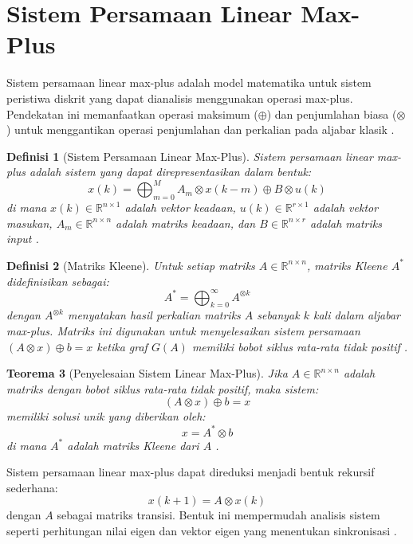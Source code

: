 \documentclass{file/TA-ITS}
\newtheorem{definisi}{Definisi}[section]
\newtheorem{teorema}[definisi]{Teorema}
\theoremstyle{definition}
\theoremstyle{definition}
\theoremstyle{plain}
\newcommand{\Real}{\mathbb{R}}
\begin{document}
\section{Sistem Persamaan Linear Max-Plus}

Sistem persamaan linear max-plus adalah model matematika untuk sistem peristiwa diskrit yang dapat dianalisis menggunakan operasi max-plus. Pendekatan ini memanfaatkan operasi maksimum (\(\oplus\)) dan penjumlahan biasa (\(\otimes\)) untuk menggantikan operasi penjumlahan dan perkalian pada aljabar klasik \cite{baccelli, heidergott}.

\begin{definisi}[Sistem Persamaan Linear Max-Plus]
Sistem persamaan linear max-plus adalah sistem yang dapat direpresentasikan dalam bentuk:
\[
x(k) = \bigoplus_{m=0}^M A_m \otimes x(k-m) \oplus B \otimes u(k)
\]
di mana \(x(k) \in \Real^{n \times 1}\) adalah vektor keadaan, \(u(k) \in \Real^{r \times 1}\) adalah vektor masukan, \(A_m \in \Real^{n \times n}\) adalah matriks keadaan, dan \(B \in \Real^{n \times r}\) adalah matriks input \cite{baccelli}.
\end{definisi}

\begin{definisi}[Matriks Kleene]
Untuk setiap matriks \(A \in \Real^{n \times n}\), matriks Kleene \(A^*\) didefinisikan sebagai:
\[
A^* = \bigoplus_{k=0}^\infty A^{\otimes k}
\]
dengan \(A^{\otimes k}\) menyatakan hasil perkalian matriks \(A\) sebanyak \(k\) kali dalam aljabar max-plus. Matriks ini digunakan untuk menyelesaikan sistem persamaan \((A \otimes x) \oplus b = x\) ketika graf \(G(A)\) memiliki bobot siklus rata-rata tidak positif \cite{subiono2015minmaxplus}.
\end{definisi}

\begin{teorema}[Penyelesaian Sistem Linear Max-Plus]
Jika \(A \in \Real^{n \times n}\) adalah matriks dengan bobot siklus rata-rata tidak positif, maka sistem:
\[
(A \otimes x) \oplus b = x
\]
memiliki solusi unik yang diberikan oleh:
\[
x = A^* \otimes b
\]
di mana \(A^*\) adalah matriks Kleene dari \(A\) \cite{baccelli}.
\end{teorema}

Sistem persamaan linear max-plus dapat direduksi menjadi bentuk rekursif sederhana:
\[
x(k+1) = A \otimes x(k)
\]
dengan \(A\) sebagai matriks transisi. Bentuk ini mempermudah analisis sistem seperti perhitungan nilai eigen dan vektor eigen yang menentukan sinkronisasi \cite{andro2020}.
\end{document}
